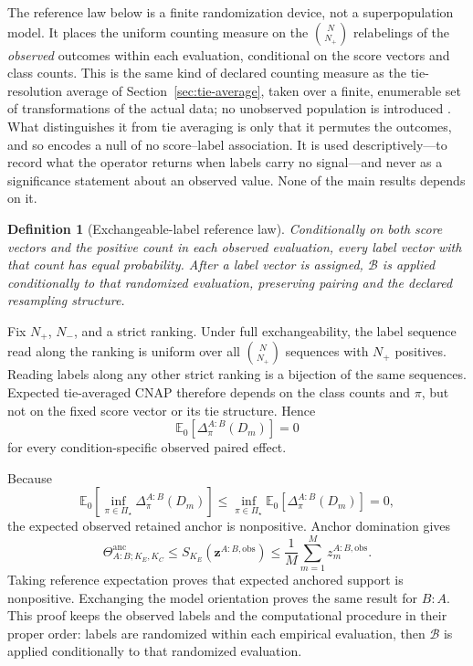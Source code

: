 \documentclass[11pt]{article}
\newcommand{\PSet}{\Pi_\star}
\newcommand{\Boot}{\mathcal{B}}
\newcommand{\E}{\mathbb{E}}
\newcommand{\Thetaanc}{\Theta^{\mathrm{anc}}}
\newtheorem{definition}{Definition}
\theoremstyle{remark}
\begin{document}
The reference law below is a finite randomization device, not a superpopulation
model. It places the uniform counting measure on the $\binom{N}{N_+}$
relabelings of the \emph{observed} outcomes within each evaluation, conditional
on the score vectors and class counts. This is the same kind of declared
counting measure as the tie-resolution average of
Section~\ref{sec:tie-average}, taken over a finite, enumerable set of
transformations of the actual data; no unobserved population is introduced
\cite{fisher1935design,pitman1937significance}. What distinguishes it from tie
averaging is only that it permutes the outcomes, and so encodes a null of no
score--label association. It is used descriptively---to record what the operator
returns when labels carry no signal---and never as a significance statement
about an observed value. None of the main results depends on it.

\begin{definition}[Exchangeable-label reference law]
Conditionally on both score vectors and the positive count in each observed
evaluation, every label vector with that count has equal probability. After a
label vector is assigned, $\Boot$ is applied conditionally to that randomized
evaluation, preserving pairing and the declared resampling structure.
\end{definition}

Fix $N_+$, $N_-$, and a strict ranking. Under full exchangeability, the label
sequence read along the ranking is uniform over all $\binom N{N_+}$ sequences
with $N_+$ positives. Reading labels along any other strict ranking is a
bijection of the same sequences. Expected tie-averaged CNAP therefore depends
on the class counts and $\pi$, but not on the fixed score vector or its tie
structure. Hence
\begin{equation}
\E_0[\Delta^{A:B}_\pi(D_m)]=0
\label{eq:reference-cell}
\end{equation}
for every condition-specific observed paired effect.

Because
\[
\E_0\!\left[
\inf_{\pi\in\PSet}\Delta^{A:B}_\pi(D_m)
\right]
\leq
\inf_{\pi\in\PSet}
\E_0[\Delta^{A:B}_\pi(D_m)]
=0,
\]
the expected observed retained anchor is nonpositive. Anchor domination gives
\[
\Thetaanc_{A:B;K_E,K_C}
\leq
S_{K_E}(\mathbf z^{A:B,\mathrm{obs}})
\leq
\frac1M\sum_{m=1}^Mz_m^{A:B,\mathrm{obs}}.
\]
Taking reference expectation proves that expected anchored support is
nonpositive. Exchanging the model orientation proves the same result for
$B:A$. This proof keeps the observed labels and the computational procedure in
their proper order: labels are randomized within each empirical evaluation,
then $\Boot$ is applied conditionally to that randomized evaluation.
\end{document}
